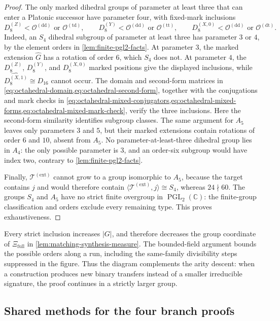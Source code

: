 \documentclass[11pt,letterpaper,onecolumn]{article}
\theoremstyle{plain}
\theoremstyle{definition}
\theoremstyle{remark}
\newcommand{\DihZ}[1]{{D_{#1}^{(Z)}}}
\newcommand{\DihY}[1]{{D_{#1}^{(Y)}}}
\newcommand{\DihXzero}[1]{{D_{#1}^{(X,0)}}}
\newcommand{\DihXone}[1]{{D_{#1}^{(X,1)}}}
\newcommand{\TetExt}{{\mathcal T^{(\mathrm{ext})}}}
\newcommand{\OctDD}{{\mathcal O^{(\mathrm{dd})}}}
\newcommand{\OctTT}{{\mathcal O^{(\mathrm{tt})}}}
\newcommand{\OctDT}{{\mathcal O^{(\mathrm{dt})}}}
\newcommand{\OctTD}{{\mathcal O^{(\mathrm{td})}}}
\newcommand{\PGL}{\operatorname{PGL}}
\begin{document}
\begin{proof}
The only marked dihedral groups of parameter at least three that can enter
a Platonic successor have parameter four, with fixed-mark inclusions
\[
 \DihZ{8}<\OctDD\text{ or }\OctTD,
\qquad
 \DihY{8}<\OctDD\text{ or }\OctTT,
\qquad
 \DihXzero{8}<\OctDD\text{ or }\OctDT.
\]
Indeed, an \(S_4\) dihedral subgroup of parameter at least three has
parameter \(3\) or \(4\), by the element orders in
\cref{lem:finite-pgl2-facts}.  At parameter \(3\), the marked extension
\(\widehat G\) has a rotation of order \(6\), which \(S_4\) does not.
At parameter \(4\), the \(\DihZ{8}\), \(\DihY{8}\), and
\(\DihXzero{8}\) marked positions give the displayed inclusions, while
\(\widehat{\DihXone{8}}\cong D_{16}\) cannot occur. The domain and
second-form matrices in \cref{eq:octahedral-domain,eq:octahedral-second-form},
together with the conjugations and mark checks in
\cref{eq:octahedral-mixed-conjugators,eq:octahedral-mixed-forms,eq:octahedral-mixed-mark-check},
verify the three inclusions. Here the second-form similarity identifies
subgroup classes. The same argument for \(A_5\)
leaves only parameters \(3\) and \(5\), but their marked extensions contain
rotations of order \(6\) and \(10\), absent from \(A_5\).  No
parameter-at-least-three dihedral group lies in \(A_4\): the only possible
parameter is \(3\), and an order-six subgroup would have index two,
contrary to \cref{lem:finite-pgl2-facts}.

Finally, \(\TetExt\) cannot grow to a group isomorphic to \(A_5\), because the
target contains \(j\) and would therefore contain
\(\langle\TetExt,j\rangle\cong S_4\), whereas
\(24\nmid60\).  The groups \(S_4\) and \(A_5\) have no strict finite
overgroup in \(\PGL_2(\mathbb C)\): the finite-group classification and
orders exclude every remaining type.  This proves exhaustiveness.
\end{proof}

Every strict inclusion increases \(|G|\), and therefore decreases the
group coordinate of \(\Xi_{\mathrm{full}}\) in \cref{lem:matching-synthesis-measure}.
The bounded-field argument bounds the possible orders along a run,
including the same-family divisibility steps suppressed in the figure.
Thus the diagram complements the arity descent: when a construction
produces new binary transfers instead of a smaller irreducible signature,
the proof continues in a strictly larger group.

\subsection{Shared methods for the four branch proofs}
\label{subsec:shared-matching-methods}
\label{sec:equality-q4-boundary}
\label{proofsec:finite-certificates}
\end{document}
